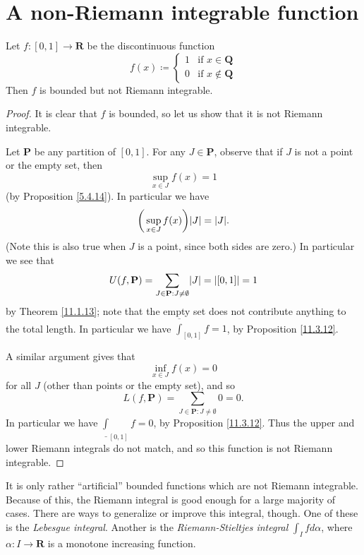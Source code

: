 \section{A non-Riemann integrable function}\label{sec 11.7}

\begin{proposition}\label{11.7.1}
    Let \(f : [0, 1] \to \mathbf{R}\) be the discontinuous function
    \[
        f(x) \coloneqq \begin{cases}
            1 & \text{if } x \in \mathbf{Q} \\
            0 & \text{if } x \notin \mathbf{Q}
        \end{cases}
    \]
    Then \(f\) is bounded but not Riemann integrable.
\end{proposition}

\begin{proof}
    It is clear that \(f\) is bounded, so let us show that it is not Riemann integrable.

    Let \(\mathbf{P}\) be any partition of \([0, 1]\).
    For any \(J \in \mathbf{P}\), observe that if \(J\) is not a point or the empty set, then
    \[
        \sup_{x \in J} f(x) = 1
    \]
    (by Proposition \ref{5.4.14}).
    In particular we have
    \[
        \bigg(\sup_{x \in J} f(x)\bigg) \abs*{J} = \abs*{J}.
    \]
    (Note this is also true when \(J\) is a point, since both sides are zero.)
    In particular we see that
    \[
        U(f, \mathbf{P}) = \sum_{J \in \mathbf{P} : J \neq \emptyset} \abs*{J} = \abs*{[0, 1]} = 1
    \]
    by Theorem \ref{11.1.13};
    note that the empty set does not contribute anything to the total length.
    In particular we have \(\overline{\int}_{[0, 1]} f = 1\), by Proposition \ref{11.3.12}.

    A similar argument gives that
    \[
        \inf_{x \in J} f(x) = 0
    \]
    for all \(J\) (other than points or the empty set), and so
    \[
        L(f, \mathbf{P}) = \sum_{J \in \mathbf{P} : J \neq \emptyset} 0 = 0.
    \]
    In particular we have \(\underline{\int}_{[0, 1]} f = 0\), by Proposition \ref{11.3.12}.
    Thus the upper and lower Riemann integrals do not match, and so this function is not Riemann integrable.
\end{proof}

\begin{remark}\label{11.7.2}
    It is only rather ``artificial'' bounded functions which are not Riemann integrable.
    Because of this, the Riemann integral is good enough for a large majority of cases.
    There are ways to generalize or improve this integral, though.
    One of these is the \emph{Lebesgue integral}.
    Another is the \emph{Riemann-Stieltjes integral} \(\int_I f d\alpha\), where \(\alpha : I \to \mathbf{R}\) is a monotone increasing function.
\end{remark}